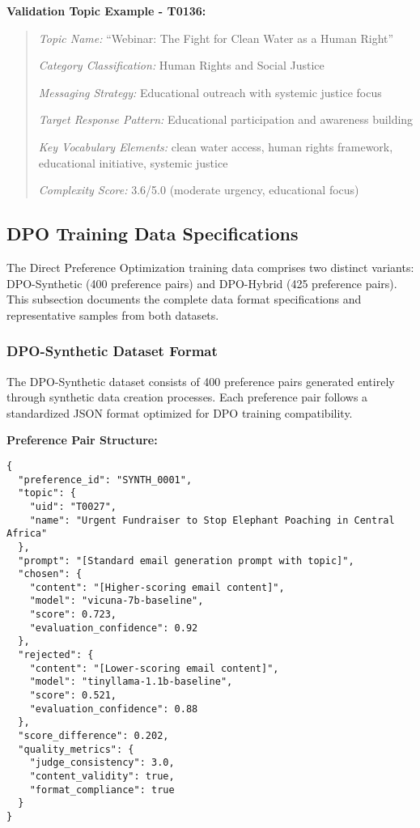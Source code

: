\textbf{Validation Topic Example - T0136:}
\begin{quote}
\textit{Topic Name:} ``Webinar: The Fight for Clean Water as a Human Right''

\textit{Category Classification:} Human Rights and Social Justice

\textit{Messaging Strategy:} Educational outreach with systemic justice focus

\textit{Target Response Pattern:} Educational participation and awareness building

\textit{Key Vocabulary Elements:} clean water access, human rights framework, educational initiative, systemic justice

\textit{Complexity Score:} 3.6/5.0 (moderate urgency, educational focus)
\end{quote}

\subsection{DPO Training Data Specifications}
\label{subsec:dpo-training-data-specifications}

The Direct Preference Optimization training data comprises two distinct variants: DPO-Synthetic (400 preference pairs) and DPO-Hybrid (425 preference pairs). This subsection documents the complete data format specifications and representative samples from both datasets.

\subsubsection{DPO-Synthetic Dataset Format}

The DPO-Synthetic dataset consists of 400 preference pairs generated entirely through synthetic data creation processes. Each preference pair follows a standardized JSON format optimized for DPO training compatibility.

\textbf{Preference Pair Structure:}
\begin{verbatim}
{
  "preference_id": "SYNTH_0001",
  "topic": {
    "uid": "T0027",
    "name": "Urgent Fundraiser to Stop Elephant Poaching in Central Africa"
  },
  "prompt": "[Standard email generation prompt with topic]",
  "chosen": {
    "content": "[Higher-scoring email content]",
    "model": "vicuna-7b-baseline",
    "score": 0.723,
    "evaluation_confidence": 0.92
  },
  "rejected": {
    "content": "[Lower-scoring email content]",
    "model": "tinyllama-1.1b-baseline", 
    "score": 0.521,
    "evaluation_confidence": 0.88
  },
  "score_difference": 0.202,
  "quality_metrics": {
    "judge_consistency": 3.0,
    "content_validity": true,
    "format_compliance": true
  }
}
\end{verbatim}


